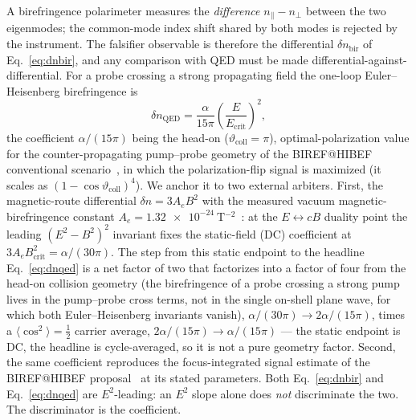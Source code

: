 \documentclass[aps,prd,twocolumn,superscriptaddress,nofootinbib,longbibliography]{revtex4-2}
\newcommand{\Ecrit}{E_{\mathrm{crit}}}
\newcommand{\dnbir}{\delta n_{\mathrm{bir}}}
\begin{document}
A birefringence polarimeter measures the \emph{difference} $n_\parallel-n_\perp$
between the two eigenmodes; the common-mode index shift shared by both modes is
rejected by the instrument. The falsifier observable is therefore the
differential $\dnbir$ of Eq.~\eqref{eq:dnbir}, and any comparison with QED must
be made differential-against-differential. For a probe crossing a strong
propagating field the one-loop Euler--Heisenberg birefringence
is~\cite{HeisenbergEuler1936,Karbstein2015,Karbstein2021}
%
\begin{equation}
  \delta n_{\mathrm{QED}}=\frac{\alpha}{15\pi}
  \left(\frac{E}{\Ecrit}\right)^2 ,
  \label{eq:dnqed}
\end{equation}
%
the coefficient $\alpha/(15\pi)$ being the head-on ($\vartheta_{\mathrm{coll}}=\pi$),
optimal-polarization value for the counter-propagating pump--probe geometry of the
BIREF@HIBEF conventional scenario~\cite{Karbstein2015,BirefHibefLoI2025}, in which
the polarization-flip signal is maximized (it scales as
$(1-\cos\vartheta_{\mathrm{coll}})^4$). We anchor it to two external arbiters.
First, the magnetic-route differential
$\delta n = 3A_e B^2$ with the measured vacuum magnetic-birefringence constant
$A_e = \SI{1.32e-24}{\tesla^{-2}}$~\cite{Ejlli2020,BattestiRizzo2013}: at the
$E\leftrightarrow cB$ duality point the leading $(E^2-B^2)^2$ invariant fixes the
static-field (DC) coefficient at $3A_eB_{\mathrm{crit}}^2=\alpha/(30\pi)$. The
step from this static endpoint to the headline Eq.~\eqref{eq:dnqed} is a net
factor of two that factorizes into a factor of four from the head-on collision
geometry (the birefringence of a probe crossing a strong pump lives in the
pump--probe cross terms, not in the single on-shell plane wave, for which both
Euler--Heisenberg invariants vanish), $\alpha/(30\pi)\to2\alpha/(15\pi)$, times a
$\langle\cos^2\rangle=\tfrac12$ carrier average, $2\alpha/(15\pi)\to\alpha/(15\pi)$
--- the static endpoint is DC, the headline is cycle-averaged, so it is not a pure
geometry factor. Second, the same coefficient reproduces the focus-integrated
signal estimate of the BIREF@HIBEF proposal~\cite{BirefHibefLoI2025} at its stated
parameters. Both Eq.~\eqref{eq:dnbir} and Eq.~\eqref{eq:dnqed} are $E^2$-leading:
an $E^2$ slope alone does \emph{not} discriminate the two. The discriminator is
the coefficient.
\end{document}
